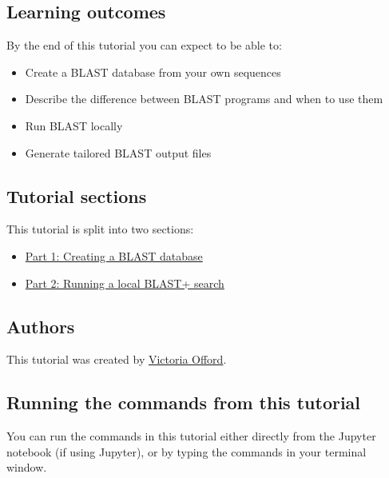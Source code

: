\documentclass[11pt]{article}
\providecommand{\tightlist}{%
      \setlength{\itemsep}{0pt}\setlength{\parskip}{0pt}}
\begin{document}
\hypertarget{learning-outcomes}{%
\subsection{Learning outcomes}\label{learning-outcomes}}

By the end of this tutorial you can expect to be able to:

\begin{itemize}
\tightlist
\item
  Create a BLAST database from your own sequences
\item
  Describe the difference between BLAST programs and when to use them
\item
  Run BLAST locally
\item
  Generate tailored BLAST output files
\end{itemize}

\hypertarget{tutorial-sections}{%
\subsection{Tutorial sections}\label{tutorial-sections}}

This tutorial is split into two sections:

\begin{itemize}
\tightlist
\item
  \href{format_database.ipynb}{Part 1: Creating a BLAST database}
\item
  \href{run_blast.ipynb}{Part 2: Running a local BLAST+ search}
\end{itemize}

\hypertarget{authors}{%
\subsection{Authors}\label{authors}}

This tutorial was created by \href{https://github.com/vaofford}{Victoria
Offord}.

\hypertarget{running-the-commands-from-this-tutorial}{%
\subsection{Running the commands from this
tutorial}\label{running-the-commands-from-this-tutorial}}

You can run the commands in this tutorial either directly from the
Jupyter notebook (if using Jupyter), or by typing the commands in your
terminal window.
\end{document}
